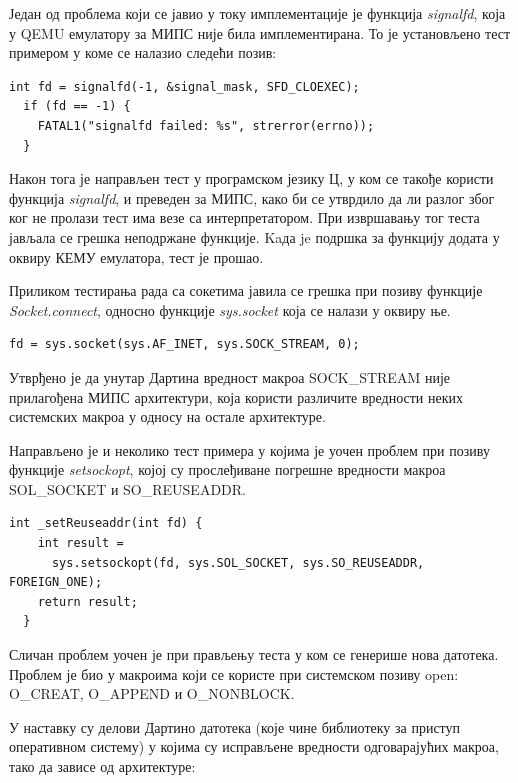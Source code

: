 \documentclass[12pt,oneside]{memoir}
\begin{document}
Један од проблема који се јавио у току имплементације је функција \textit{signalfd}, која у QEMU емулатору за МИПС није била имплементирана. То је установљено тест примером у коме се налазио следећи позив:\\

\begin{verbatim}
int fd = signalfd(-1, &signal_mask, SFD_CLOEXEC);
  if (fd == -1) {
    FATAL1("signalfd failed: %s", strerror(errno));
  }
\end{verbatim}

Након тога је направљен тест у програмском језику Ц, у ком се такође користи функција \textit{signalfd}, и преведен за МИПС, како би се утврдило да ли разлог због ког не пролази тест има везе са интерпретатором. При извршавању тог теста јављала се грешка неподржане функције. Kaда je подршка за функцију додата у оквиру КЕМУ емулатора, тест је прошао.

Приликом тестирања рада са сокетима јавила се грешка при позиву функције \textit{Socket.connect}, односно функције \textit{sys.socket} која се налази у оквиру ње.\\

\begin{verbatim}
fd = sys.socket(sys.AF_INET, sys.SOCK_STREAM, 0);
\end{verbatim}

Утврђено је да унутар Дартина вредност макроа SOCK\_STREAM није прилагођена МИПС архитектури, која користи различите вредности неких системских макроа у односу на остале архитектуре.

Направљено је и неколико тест примера у којима је уочен проблем при позиву функције \textit{setsockopt}, којој су прослеђиване погрешне вредности макроа SOL\_SOCKET и SO\_REUSEADDR.\\

\begin{verbatim}
int _setReuseaddr(int fd) {
    int result =
      sys.setsockopt(fd, sys.SOL_SOCKET, sys.SO_REUSEADDR, FOREIGN_ONE);
    return result;
  }
\end{verbatim}

Сличан проблем уочен је при прављењу теста у ком се генерише нова датотека. Проблем је био у макроима који се користе при системском позиву open: O\_CREAT, O\_APPEND и O\_NONBLOCK.

У наставку су делови Дартино датотека (које чине библиотеку за приступ оперативном систему) у којима су исправљене вредности одговарајућих макроа, тако да зависе од архитектуре:\\
\end{document}
